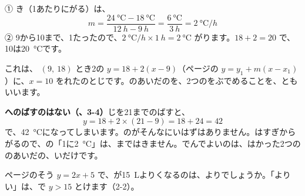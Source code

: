 \par\vspace{4pt}
\noindent ① き（1あたりにがる）は、
\[ m=\frac{\qty{24}{\degreeCelsius}-\qty{18}{\degreeCelsius}}{\qty{12}{h}-\qty{9}{h}}=\frac{\qty{6}{\degreeCelsius}}{\qty{3}{h}}=\qty{2}{\degreeCelsius/h} \]
② 9から10まで、1たったので、$\qty{2}{\degreeCelsius/h}\times\qty{1}{h}=\qty{2}{\degreeCelsius}$ がります。$18+2=20$ で、10は\qty{20}{\degreeCelsius}です。

これは、 $(9,\ 18)$ とき2の $y=18+2(x-9)$（\pageref{bk:3-5:tenkatamuki}ページの $y=y_1+m(x-x_1)$）に、$x=10$ をれたのとじです。のあいだのを、2つのをぶでめることを、\textbf{}ともいいます。

\textbf{へのばすのはない（、3-4）}\quad {}じを21までのばすと、
\[ y=18+2\times(21-9)=18+24=42 \]
で、\qty{42}{\degreeCelsius}になってしまいます。のがそんなにいはずはありません。はすぎからがるので、の「1に\qty{2}{\degreeCelsius}」は、まではきません。でんでよいのは、はかった2つののあいだの、いだけです。


\leavevmode\label{bk:3-5:futou}\pageref{bk:3-5:ichiji}ページのそう $y=2x+5$ で、が\qty{15}{L}よりくなるのは、よりでしょうか。「よりい」は、で $y>15$ とけます（2-2）。

